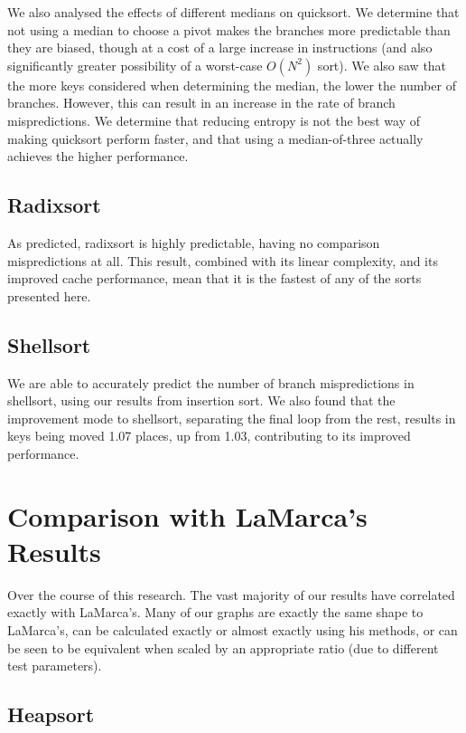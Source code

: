 We also analysed the effects of different medians on quicksort. We determine that
not using a median to choose a pivot makes the branches more predictable than
they are biased, though at a cost of a large increase in instructions (and also
significantly greater possibility of a worst-case $O(N^2)$ sort). We also saw
that the more keys considered when determining the median, the lower the number
of branches. However, this can result in an increase in the rate of branch
mispredictions. We determine that reducing entropy is not the best way of making
quicksort perform faster, and that using a median-of-three actually achieves the
higher performance.

\subsection{Radixsort}

As predicted, radixsort is highly predictable, having no comparison
mispredictions at all. This result, combined with its linear complexity, and its
improved cache performance, mean that it is the fastest of any of the sorts
presented here.

\subsection{Shellsort}

We are able to accurately predict the number of branch mispredictions in
shellsort, using our results from insertion sort. We also found that the
improvement mode to shellsort, separating the final loop from the rest, results
in keys being moved 1.07 places, up from 1.03, contributing to its improved
performance.

\section{Comparison with LaMarca's Results}

Over the course of this research. The vast majority of our results have
correlated exactly with LaMarca's. Many of our graphs are exactly the same
shape to LaMarca's, can be calculated exactly or almost exactly using his
methods, or can be seen to be equivalent when scaled by an appropriate ratio
(due to different test parameters).

\subsection{Heapsort}


